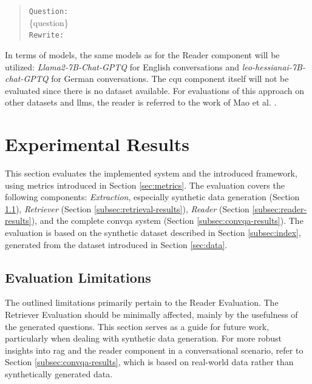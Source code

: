 \begin{quote}
    \texttt{Question:}\\
    \{question\}\\
    \texttt{Rewrite:}\\
\end{quote}

In terms of models, the same models as for the Reader component will be utilized: \textit{Llama2-7B-Chat-GPTQ} for English conversations and \textit{leo-hessianai-7B-chat-GPTQ} for German conversations. The \gls{cqu} component itself will not be evaluated since there is no dataset available. For evaluations of this approach on other datasets and \gls{llm}s, the reader is referred to the work of Mao et al. \cite{mao_large_2023}.

\section{Experimental Results}
\label{sec:results}

This section evaluates the implemented system and the introduced framework, using metrics introduced in Section \ref{sec:metrics}. The evaluation covers the following components: \textit{Extraction}, especially synthetic data generation (Section \ref{subsec:data-augmentation-quality}), \textit{Retriever} (Section \ref{subsec:retrieval-results}), \textit{Reader} (Section \ref{subsec:reader-results}), and the complete \gls{convqa} system (Section \ref{subsec:convqa-results}). The evaluation is based on the synthetic dataset described in Section \ref{subsec:index}, generated from the dataset introduced in Section \ref{sec:data}.

\subsection{Evaluation Limitations}
\label{subsec:data-augmentation-quality}

The outlined limitations primarily pertain to the Reader Evaluation. The Retriever Evaluation should be minimally affected, mainly by the usefulness of the generated questions. This section serves as a guide for future work, particularly when dealing with synthetic data generation. For more robust insights into \gls{rag} and the reader component in a conversational scenario, refer to Section \ref{subsec:convqa-results}, which is based on real-world data rather than synthetically generated data.

